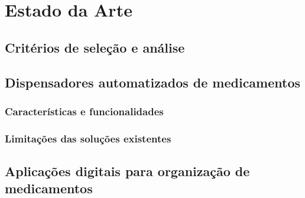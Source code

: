 
\chapter{Estado da Arte}
\label{chap:estado_da_arte}


\section{Critérios de seleção e análise}
\label{sec:criterios_estado_arte}


\section{Dispensadores automatizados de medicamentos}
\label{sec:dispensadores}


\subsection{Características e funcionalidades}
\label{subsec:caracteristicas_dispensadores}


\subsection{Limitações das soluções existentes}
\label{subsec:limitacoes_dispensadores}


\section{Aplicações digitais para organização de medicamentos}
\label{sec:aplicacoes_medicamentos}

